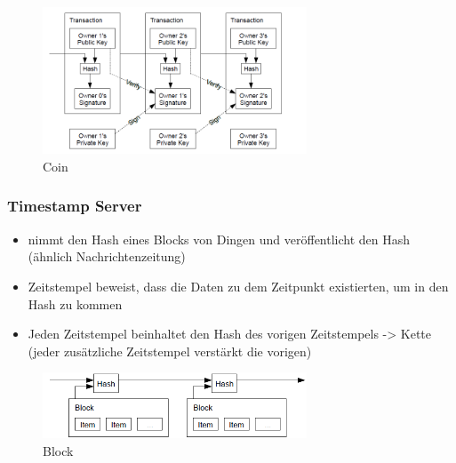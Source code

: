     \begin{figure}[H]
        \centering
        \includegraphics[width=0.7\textwidth]{paperNotes/bitcoin01.PNG}
        \caption{Coin}
        \label{figure:coin}
    \end{figure}

\subsubsection*{Timestamp Server}
    \begin{itemize}
        \item nimmt den Hash eines Blocks von Dingen und veröffentlicht den Hash (ähnlich Nachrichtenzeitung)
        \item Zeitstempel beweist, dass die Daten zu dem Zeitpunkt existierten, um in den Hash zu kommen
        \item Jeden Zeitstempel beinhaltet den Hash des vorigen Zeitstempels -> Kette (jeder zusätzliche Zeitstempel verstärkt die vorigen)
    \end{itemize}
    \begin{figure}[H]
        \centering
        \includegraphics[width=0.7\textwidth]{paperNotes/bitcoin02.PNG}
        \caption{Block}
        \label{figure:block}
    \end{figure}

